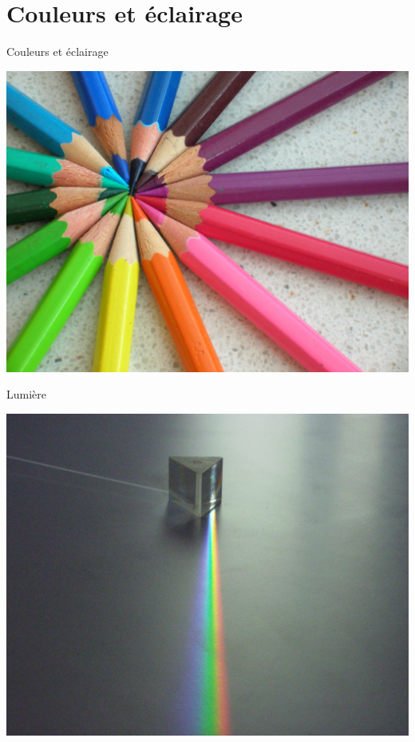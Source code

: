 \section{Couleurs et éclairage}

\begin{frame}{Couleurs et éclairage}
\begin{center}
\includegraphics[height=.6\textheight]{figs/Colored_pencils_chevre.jpg}
\end{center}
\end{frame}

\begin{frame}{Lumière}
\begin{center}
\includegraphics[height=.6\textheight]{figs/prisme.jpg}
\end{center}
\end{frame}


